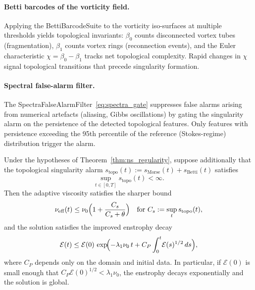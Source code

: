 \documentclass[final]{siamltex}
\begin{document}
\paragraph{Betti barcodes of the vorticity field.}
Applying the BettiBarcodeSuite to the vorticity iso-surfaces at
multiple thresholds yields topological invariants:
$\beta_0$ counts disconnected vortex tubes (fragmentation),
$\beta_1$ counts vortex rings (reconnection events), and the
Euler characteristic $\chi = \beta_0 - \beta_1$ tracks net
topological complexity.  Rapid changes in $\chi$ signal
topological transitions that precede singularity formation.

\paragraph{Spectral false-alarm filter.}
The SpectraFalseAlarmFilter~\eqref{eq:spectra_gate} suppresses
false alarms arising from numerical artefacts (aliasing, Gibbs
oscillations) by gating the singularity alarm on the persistence
of the detected topological features.  Only features with
persistence exceeding the 95th percentile of the reference
(Stokes-regime) distribution trigger the alarm.

\begin{theorem}\label{thm:ns_strong}
Under the hypotheses of Theorem~\ref{thm:ns_regularity},
suppose additionally that the topological singularity alarm
$s_{\mathrm{topo}}(t) := s_{\mathrm{Morse}}(t) +
s_{\mathrm{Betti}}(t)$ satisfies
\begin{equation}\label{eq:topo_bound}
  \sup_{t \in [0,T]} s_{\mathrm{topo}}(t) < \infty.
\end{equation}
Then the adaptive viscosity satisfies the sharper bound
\begin{equation}\label{eq:nueff_sharp}
  \nu_{\mathrm{eff}}(t) \le \nu_0\Bigl(1 +
  \frac{C_s}{C_s + \theta}\Bigr)
  \quad\text{for }C_s := \sup_t s_{\mathrm{topo}}(t),
\end{equation}
and the solution satisfies the improved enstrophy decay
\begin{equation}\label{eq:enstrophy_sharp}
  \mathcal{E}(t) \le \mathcal{E}(0)\,
  \exp\!\Bigl(-\lambda_1\nu_0\,t
  + C_P\int_0^t\!\mathcal{E}(s)^{1/2}\,ds\Bigr),
\end{equation}
where $C_P$ depends only on the domain and initial data.
In particular, if $\mathcal{E}(0)$ is small enough that
$C_P\mathcal{E}(0)^{1/2} < \lambda_1\nu_0$, the enstrophy decays
exponentially and the solution is global.
\end{theorem}
\end{document}
